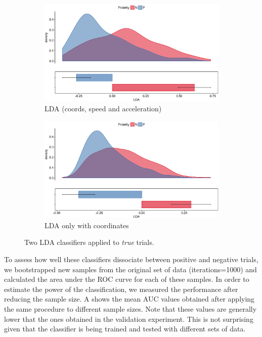 \documentclass{article}
\begin{document}
\begin{figure}
\centering
\begin{subfigure}[b]{0.45\textwidth}
\includegraphics[width=\textwidth]{lda_distribution_negation.png}
\caption{LDA (coords, speed and acceleration) }
\end{subfigure}
\begin{subfigure}[b]{0.45\textwidth}
\includegraphics[width=\textwidth]{lda_coord_distribution_negation.png}
\caption{LDA only with coordinates}
\end{subfigure}
\caption{Two LDA classifiers applied to \textit{true} trials. }
\label{fig:lda_negation}
\end{figure}

To assess how well these classifiers dissociate between positive and negative trials, we bootstrapped new samples from the original set of data (iterations=1000) and calculated the area under the ROC curve for each of these samples. 
In order to estimate the power of the classification, we measured the performance after reducing the sample size. A shows the mean AUC values obtained after applying the same procedure to different sample sizes. 
Note that these values are generally lower that the ones obtained in the validation experiment. This is not surprising given that the classifier is being trained and tested with different sets of data. 
\end{document}
